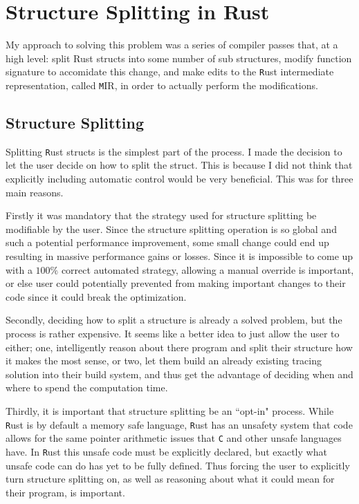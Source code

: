 \documentclass[12pt,final]{article}
\newcommand{\rustname}{{\texttt Rust}}
\def \rust {\rustname{}\xspace}
\newcommand{\mirname}{{\texttt MIR}}
\def \mir {\mirname{}\xspace}
\begin{document}
\section{Structure Splitting in Rust}

My approach to solving this problem was a series of compiler passes that, at a high level:
split Rust structs into some number of sub structures, modify function signature to accomidate this change,
and make edits to the \rust intermediate representation, called \mir, in order 
to actually perform the modifications.

\subsection{Structure Splitting}
Splitting \rust structs is the simplest part of the process. I made the decision to let the user decide
on how to split the struct. This is because I did not think that explicitly including automatic control would 
be very beneficial. This was for three main reasons. 

Firstly it was mandatory that the strategy used for structure splitting be modifiable by the user.
Since the structure splitting operation is so global and such a potential performance improvement,
some small change could end up resulting in massive performance gains or losses. Since it is impossible
to come up with a $100\%$ correct automated strategy, allowing a manual override is important, or else
user could potentially prevented from making important changes to their code since it could break the optimization.

Secondly, deciding how to split a structure is already a solved problem,
but the process is rather expensive. It seems like a better idea to just allow the user to either; one, 
intelligently reason about there program and split their structure how it makes the most sense, or two, 
let them build an already existing tracing solution into their build system, and thus get the advantage
of deciding when and where to spend the computation time.

Thirdly, it is important that structure splitting be an ``opt-in" process. While \rust is by default
a memory safe language, \rust has an unsafety system that code allows for the same pointer arithmetic 
issues that \texttt{C} and other unsafe languages have. In \rust this unsafe code must be explicitly
declared, but exactly what unsafe code can do has yet to be fully defined. Thus forcing the user to explicitly 
turn structure splitting on, as well as reasoning about what it could mean for their program, is important.
\end{document}
